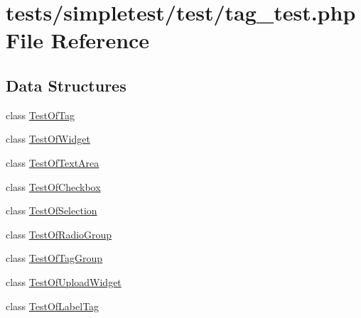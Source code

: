 \hypertarget{tag__test_8php}{\section{tests/simpletest/test/tag\-\_\-test.php File Reference}
\label{tag__test_8php}
}
\subsection*{Data Structures}
\begin{DoxyCompactItemize}
\item 
class \hyperlink{class_test_of_tag}{Test\-Of\-Tag}
\item 
class \hyperlink{class_test_of_widget}{Test\-Of\-Widget}
\item 
class \hyperlink{class_test_of_text_area}{Test\-Of\-Text\-Area}
\item 
class \hyperlink{class_test_of_checkbox}{Test\-Of\-Checkbox}
\item 
class \hyperlink{class_test_of_selection}{Test\-Of\-Selection}
\item 
class \hyperlink{class_test_of_radio_group}{Test\-Of\-Radio\-Group}
\item 
class \hyperlink{class_test_of_tag_group}{Test\-Of\-Tag\-Group}
\item 
class \hyperlink{class_test_of_upload_widget}{Test\-Of\-Upload\-Widget}
\item 
class \hyperlink{class_test_of_label_tag}{Test\-Of\-Label\-Tag}
\end{DoxyCompactItemize}

